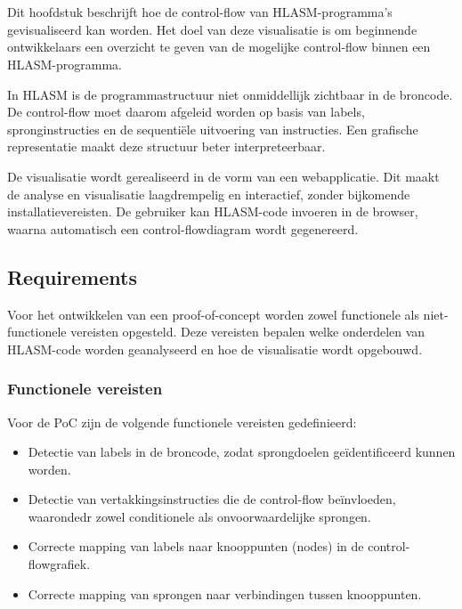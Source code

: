 \chapter{}%
\label{ch:cfvisualisatie}

Dit hoofdstuk beschrijft hoe de control-flow van HLASM-programma’s gevisualiseerd kan worden. Het doel van deze visualisatie is om beginnende ontwikkelaars een overzicht te geven van de mogelijke control-flow binnen een HLASM-programma.

In HLASM is de programmastructuur niet onmiddellijk zichtbaar in de broncode. De control-flow moet daarom afgeleid worden op basis van labels, spronginstructies en de sequentiële uitvoering van instructies. Een grafische representatie maakt deze structuur beter interpreteerbaar.

De visualisatie wordt gerealiseerd in de vorm van een webapplicatie. Dit maakt de analyse en visualisatie laagdrempelig en interactief, zonder bijkomende installatievereisten. De gebruiker kan HLASM-code invoeren in de browser, waarna automatisch een control-flowdiagram wordt gegenereerd.

\section{Requirements}

Voor het ontwikkelen van een proof-of-concept worden zowel functionele als niet-functionele vereisten opgesteld. Deze vereisten bepalen welke onderdelen van HLASM-code worden geanalyseerd en hoe de visualisatie wordt opgebouwd.

\subsection{Functionele vereisten}

Voor de PoC zijn de volgende functionele vereisten gedefinieerd:

\begin{itemize}
    \item Detectie van labels in de broncode, zodat sprongdoelen geïdentificeerd kunnen worden.
    \item Detectie van vertakkingsinstructies die de control-flow beïnvloeden, waarondedr zowel conditionele als onvoorwaardelijke sprongen.
    \item Correcte mapping van labels naar knooppunten (nodes) in de control-flowgrafiek.
    \item Correcte mapping van sprongen naar verbindingen tussen knooppunten.
\end{itemize}

